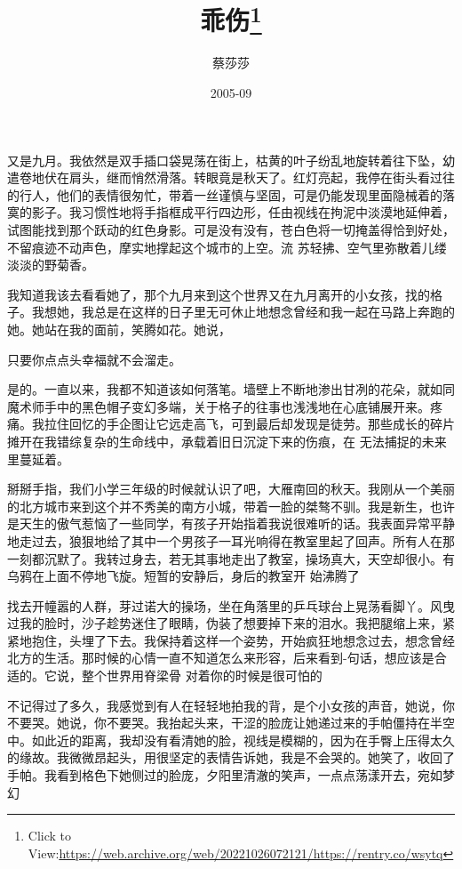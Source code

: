 \documentclass{article}
\title{乖伤\footnote{Click to View:\url{https://web.archive.org/web/20221026072121/https://rentry.co/wsytq}}}
\author{蔡莎莎}
\date{2005-09}
\begin{document}

\maketitle


\Large

﻿又是九月。我依然是双手插口袋晃荡在街上，枯黄的叶子纷乱地旋转着往下坠，幼遣卷地伏在肩头，继而悄然滑落。转眼竟是秋天了。红灯亮起，我停在街头看过往的行人，他们的表情很匆忙，带着一丝谨慎与坚固，可是仍能发现里面隐械着的落寞的影子。我习惯性地将手指框成平行四边形，任由视线在拘泥中淡漠地延伸着，试图能找到那个跃动的红色身影。可是没有没有，苍白色将一切掩盖得恰到好处，不留痕迹不动声色，摩实地撑起这个城市的上空。流
苏轻拂、空气里弥散着儿缕淡淡的野菊香。 

我知道我该去看看她了，那个九月来到这个世界又在九月离开的小女孩，找的格子。我想她，我总是在这样的日子里无可休止地想念曾经和我一起在马路上奔跑的她。她站在我的面前，笑腾如花。她说，
\newpage

只要你点点头幸福就不会溜走。 

是的。一直以来，我都不知道该如何落笔。墙壁上不断地渗出甘冽的花朵，就如同魔术师手中的黑色帽子变幻多端，关于格子的往事也浅浅地在心底铺展开来。疼痛。我拉住回忆的手企图让它远走高飞，可到最后却发现是徒劳。那些成长的碎片摊开在我错综复杂的生命线中，承载着旧日沉淀下来的伤痕，在
无法捕捉的未来里蔓延着。 

掰掰手指，我们小学三年级的时候就认识了吧，大雁南回的秋天。我刚从一个美丽的北方城市来到这个并不秀美的南方小城，带着一脸的桀骜不驯。我是新生，也许是天生的傲气惹恼了一些同学，有孩子开始指着我说很难听的话。我表面异常平静地走过去，狼狠地给了其中一个男孩子一耳光响得在教室里起了回声。所有人在那一刻都沉默了。我转过身去，若无其事地走出了教室，操场真大，天空却很小。有乌鸦在上面不停地飞旋。短暂的安静后，身后的教室开
始沸腾了 

\newpage

找去开幢嚣的人群，芽过诺大的操场，坐在角落里的乒乓球台上晃荡看脚丫。风曳过我的脸时，沙子趁势迷住了眼睛，伪装了想要掉下来的泪水。我把腿缩上来，紧紧地抱住，头埋了下去。我保持着这样一个姿势，开始疯狂地想念过去，想念曾经北方的生活。那时候的心情一直不知道怎么来形容，后来看到-句话，想应该是合适的。它说，整个世界用脊梁骨
对着你的时候是很可怕的 

不记得过了多久，我感觉到有人在轻轻地拍我的背，是个小女孩的声音，她说，你不要哭。她说，你不要哭。我抬起头来，干涩的脸庞让她递过来的手帕僵持在半空中。如此近的距离，我却没有看清她的脸，视线是模糊的，因为在手臀上压得太久的缘故。我微微昂起头，用很坚定的表情告诉她，我是不会哭的。她笑了，收回了手帕。我看到格色下她侧过的脸庞，夕阳里清澈的笑声，一点点荡漾开去，宛如梦幻
 
\end{document}

